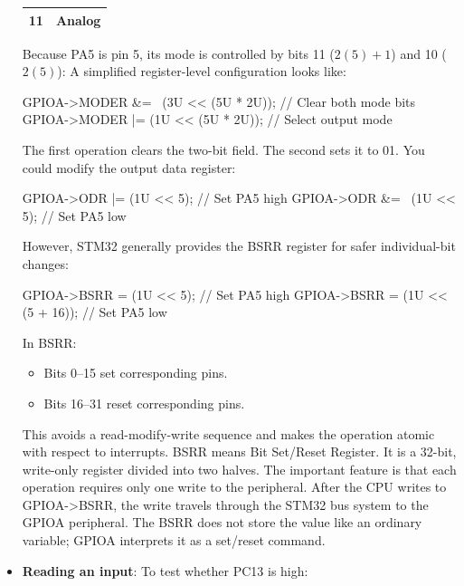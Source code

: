 \documentclass{report}
\begin{document}
\begin{itemize}
\begin{center}
\begin{tabularx}{\textwidth}{@{}XX@{}}
                    11	&Analog \\
                    \bottomrule
                \end{tabularx}
            \end{center}
            Because PA5 is pin 5, its mode is controlled by bits 11 ($2(5)+1$) and 10 ($2(5)$):
            \bigbreak \noindent 
            A simplified register-level configuration looks like:
            \bigbreak \noindent 
            \begin{cppcode}
                GPIOA->MODER &= ~(3U << (5U * 2U));  // Clear both mode bits
                GPIOA->MODER |=  (1U << (5U * 2U));  // Select output mode
            \end{cppcode}
            The first operation clears the two-bit field. The second sets it to 01.
            \bigbreak \noindent 
            You could modify the output data register:
            \bigbreak \noindent 
            \begin{cppcode}
                GPIOA->ODR |= (1U << 5);    // Set PA5 high
                GPIOA->ODR &= ~(1U << 5);   // Set PA5 low
            \end{cppcode}
            \bigbreak \noindent 
            However, STM32 generally provides the BSRR register for safer individual-bit changes:
            \bigbreak \noindent 
            \begin{cppcode}
                GPIOA->BSRR = (1U << 5);         // Set PA5 high
                GPIOA->BSRR = (1U << (5 + 16));  // Set PA5 low
            \end{cppcode}
            In BSRR:
            \begin{itemize}
                \item Bits 0–15 set corresponding pins.
                \item Bits 16–31 reset corresponding pins.
            \end{itemize}
            This avoids a read-modify-write sequence and makes the operation atomic with respect to interrupts.
            \bigbreak \noindent 
            BSRR means Bit Set/Reset Register. It is a 32-bit, write-only register divided into two halves. The important feature is that each operation requires only one write to the peripheral.
            \bigbreak \noindent 
            After the CPU writes to GPIOA->BSRR, the write travels through the STM32 bus system to the GPIOA peripheral. The BSRR does not store the value like an ordinary variable; GPIOA interprets it as a set/reset command.
        \item \textbf{Reading an input}: To test whether PC13 is high:

\end{itemize}
\end{document}
